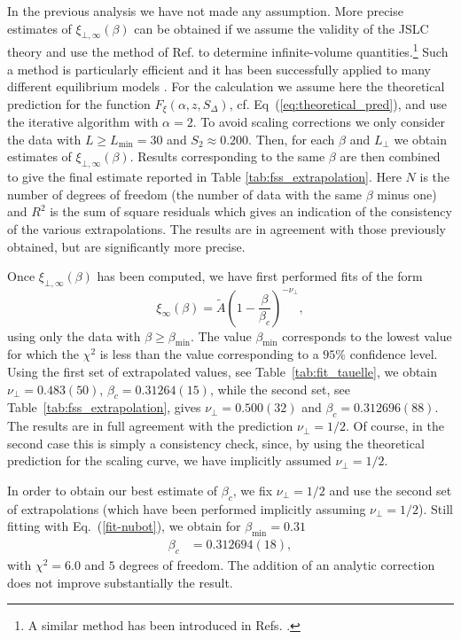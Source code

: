 \documentclass[12pt]{article}
\begin{document}
In the previous analysis we have not made any assumption. More 
precise estimates of $\xi_{\bot,\infty}(\beta)$ can be obtained if 
we assume the validity of the JSLC theory and 
use the method of 
Ref. \cite{Caracciolo95} to determine infinite-volume quantities.\footnote{
A similar method has been introduced in Refs. \cite{Luscher:1991wu,JKKim}.}
Such a method is particularly efficient and it has been successfully applied 
to many different equilibrium models 
\cite{Caracciolo95b,Caracciolo:1996ah,Mana-etal-96,Mendes-etal-96,Mana-etal-97,%
Ferreira-Sokal-99,Palassini-Caracciolo-99}. For the calculation 
we assume here the theoretical prediction for the function 
$F_\xi(\alpha,z,S_\Delta)$, cf. Eq~(\ref{eq:theoretical_pred}),
and use the iterative algorithm with 
$\alpha = 2$. 
To avoid scaling corrections we only consider the data 
with $L \ge L_{\text{min}} = 30$ and $S_2\approx 0.200$. 
Then, for each $\beta$ and $L_\bot$
we obtain estimates of $\xi_{\bot,\infty}(\beta)$. 
Results corresponding to the same $\beta$ are then 
combined to give the final estimate 
reported in Table \ref{tab:fss_extrapolation}. 
Here $N$ is the number of degrees of freedom 
(the number of data with the same $\beta$ minus one) and $R^2$ is the sum of 
square residuals which gives an indication of the consistency of the 
various extrapolations. The results are in agreement with those 
previously obtained, but are significantly more precise.


Once $\xi_{\bot,\infty}(\beta)$ has been computed,
we have first performed fits of the form
\begin{equation}
\xi_\infty(\beta) = \tilde A \left( 1-\frac{\beta}{\beta_c}\right)^{-\nu_\bot},
\label{fit-nubot}
\end{equation}
using only the data with
$\beta \ge \beta_{\text{min}}$. The value
$\beta_{\text{min}}$ corresponds to the lowest value for which
the $\chi^2$ is less than the value corresponding to 
a $95\%$ confidence level.  
Using the first set of extrapolated values,
see Table~\ref{tab:fit_tauelle}, we obtain 
$ \nu_\bot = 0.483(50)$, $\beta_c = 0.31264(15)$, 
while the second set, see Table~\ref{tab:fss_extrapolation}, gives 
$\nu_\bot = 0.500(32)$ and $\beta_c = 0.312696(88)$. The results
are in full agreement with the prediction $\nu_\bot=1/2$. 
Of course, in the second case this is simply a consistency check, 
since, by using the theoretical prediction for the scaling curve, 
we have implicitly assumed $\nu_\bot = 1/2$. 

In order to obtain our best estimate of $\beta_c$, we fix $\nu_\bot = 1/2$
and use the second set of extrapolations (which have been performed
implicitly assuming $\nu_\bot = 1/2$). 
Still fitting with Eq.~(\ref{fit-nubot}), we obtain for 
$\beta_{\text{min}}=0.31$
\begin{eqnarray}
 \beta_c & = 0.312694(18), \label{betacfinale}
\end{eqnarray}
with $\chi^2 = 6.0$ and $5$ degrees of freedom. 
The addition of 
an analytic correction does not improve substantially the result.
\end{document}
